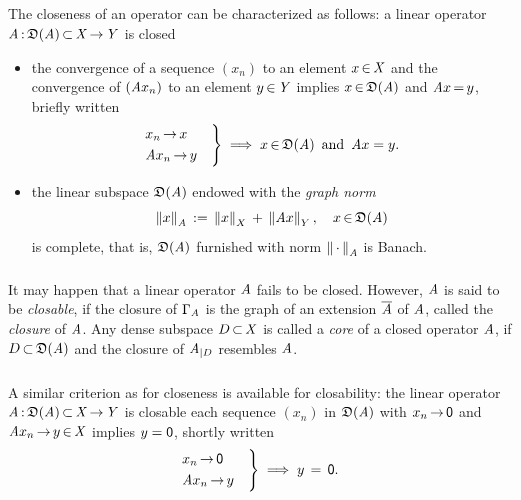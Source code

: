 \documentclass[11pt,twoside]{article}
\begin{document}
\subparagraph*{}
The closeness of an operator can be characterized as follows:
a linear operator $\mathit{A} {\,:\,} \mathfrak{D}(\mathit{A}) {\,\subset\,} \mathit{X} {\,\to\,} \mathit{Y}$ is closed
\iff

\begin{itemize}[leftmargin=12pt]
\item[1.]
the convergence of a sequence $(x_n)$ to an element $x {\,\in\,} \mathit{X}$
and the convergence of $(\mathit{A} x_n)$ to an element $y {\,\in\,} \mathit{Y}$ implies
$x {\,\in\,} \mathfrak{D}(\mathit{A})$ and $\mathit{A} x {\,=\,} y$, briefly written
\[
\begin{rcases}%
 x_n       \xto x \quad \\
 \linA x_n \xto y \quad \\
\end{rcases}
\; \Longrightarrow \;
x \xeof \domain{\linA} \, \mbox{ and } \, \linA x = y.
\]
\item[2.]
the linear subspace $\mathfrak{D}(\mathit{A})$ endowed with the \textit{graph norm}
\begin{equation}\label{GRAPH_NORM}
\left\lVert x \right\rVert_{\mathit{A}} \,:=\, \left\lVert x \right\rVert_X \, + \, \left\lVert \mathit{A} x \right\rVert_Y,
\quad
x {\,\in\,} \mathfrak{D}(\mathit{A})
\end{equation}
is complete,
that is,
$\mathfrak{D}(\mathit{A})$ furnished with norm $\left\lVert \,\cdot\, \right\rVert_{\mathit{A}}$ is Banach.
\end{itemize}

\subsubsection*{} %
It may happen that a linear operator $\mathit{A}$ fails to be closed.
However,
$\mathit{A}$ is said to be \textit{closable},
if the closure of $\Gamma_{\mathit{A}}$ is the graph
of an extension $\overline{\mathit{A}}$ of $\mathit{A}$,
called the \textit{closure} of $\mathit{A}$.
Any dense subspace $D {\,\subset\,} \mathit{X}$ is called a \textit{core}
of a closed operator $\mathit{A}$,
if $D {\,\subset\,} \mathfrak{D}(\mathit{A})$ and
the closure of $\mathit{A}_{\mid D}$ resembles $\mathit{A}$.

\subparagraph*{}
A similar criterion as for closeness is available for closability:
the linear operator $\mathit{A} {\,:\,} \mathfrak{D}(\mathit{A}) {\,\subset\,} \mathit{X} {\,\to\,} \mathit{Y}$ is closable
\iff
each sequence $(x_n)$ in $\mathfrak{D}(\mathit{A})$ with $x_n {\,\to\,} {\mathsf{0}}$
and $\mathit{A} x_n {\,\to\,} y {\,\in\,} \mathit{X}$ implies $y={\mathsf{0}}$,
shortly written
\[
\begin{rcases}%
 x_n       \xto \0 \quad \\
 \linA x_n \xto y  \quad \\
\end{rcases}
\; \Longrightarrow \;
y \= \0.
\]
\end{document}
